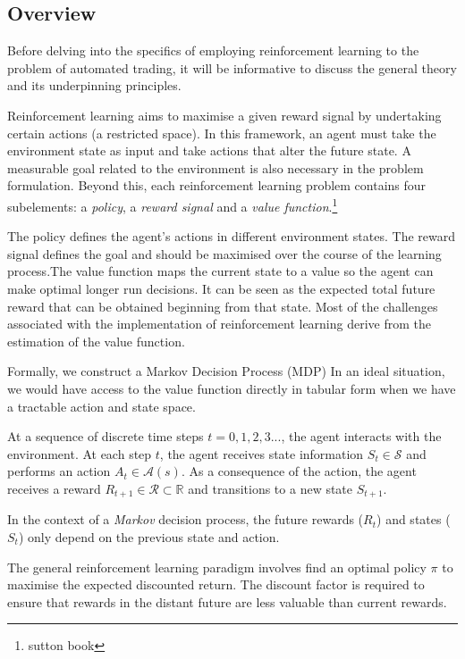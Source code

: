 \documentclass[12pt]{article}
\begin{document}
\subsection{Overview}
Before delving into the specifics of employing reinforcement learning to the problem of automated trading, it will be informative to discuss the general theory and its underpinning principles. 

Reinforcement learning aims to maximise a given reward signal by undertaking certain actions (a restricted space). In this framework, an agent must take the environment state as input and take actions that alter the future state. A measurable goal related to the environment is also necessary in the problem formulation. Beyond this, each reinforcement learning problem contains four subelements: a \textit{policy}, a \textit{reward signal} and a \textit{value function}.\footnote{sutton book }

The policy defines the agent's actions in different environment states. The reward signal defines the goal and should be maximised over the course of the learning process.The value function maps the current state to a value so the agent can make optimal longer run decisions. It can be seen as the expected total future reward that can be obtained beginning from that state. Most of the challenges associated with the implementation of reinforcement learning derive from the estimation of the value function.

Formally, we construct a Markov Decision Process (MDP)
In an ideal situation, we would have access to the value function directly in tabular form when we have a tractable action and state space.

At a sequence of discrete time steps $t = 0,1,2,3...$, the agent interacts with the environment. At each step $t$, the agent receives state information $S _ { t } \in \mathcal{S}$ and performs an action $A _ { t } \in \mathcal { A } ( s )$. As a consequence of the action, the agent receives a reward $R _ { t + 1 } \in \mathcal { R } \subset \mathbb { R }$ and transitions to a new state $S _ { t + 1 }$.

In the context of a \textit{Markov} decision process, the future rewards ($R_{t}$) and states ($S_{t}$) only depend on the previous state and action. 

The general reinforcement learning paradigm involves find an optimal policy $\pi$ to maximise the expected discounted return. The discount factor is required to ensure that rewards in the distant future are less valuable than current rewards.
\end{document}
